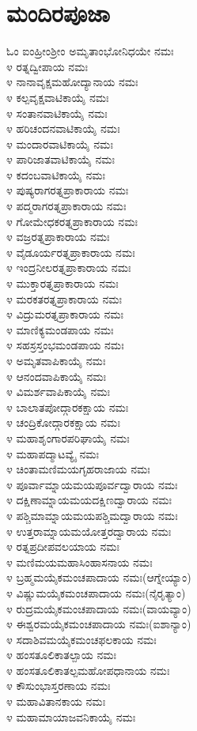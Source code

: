 \section{ಮಂದಿರಪೂಜಾ}
ಓಂ ಐಂಹ್ರೀಂಶ್ರೀಂ ಅಮೃತಾಂಭೋನಿಧಯೇ ನಮಃ\\
೪ ರತ್ನದ್ವೀಪಾಯ ನಮಃ\\
೪ ನಾನಾವೃಕ್ಷಮಹೋದ್ಯಾನಾಯ ನಮಃ\\
೪ ಕಲ್ಪವೃಕ್ಷವಾಟಿಕಾಯೈ ನಮಃ\\
೪ ಸಂತಾನವಾಟಿಕಾಯೈ ನಮಃ\\
೪ ಹರಿಚಂದನವಾಟಿಕಾಯೈ ನಮಃ\\
೪ ಮಂದಾರವಾಟಿಕಾಯೈ ನಮಃ\\
೪ ಪಾರಿಜಾತವಾಟಿಕಾಯೈ ನಮಃ\\
೪ ಕದಂಬವಾಟಿಕಾಯೈ ನಮಃ\\
೪ ಪುಷ್ಯರಾಗರತ್ನಪ್ರಾಕಾರಾಯ ನಮಃ\\
೪ ಪದ್ಮರಾಗರತ್ನಪ್ರಾಕಾರಾಯ ನಮಃ\\
೪ ಗೋಮೇಧಕರತ್ನಪ್ರಾಕಾರಾಯ ನಮಃ\\
೪ ವಜ್ರರತ್ನಪ್ರಾಕಾರಾಯ ನಮಃ\\
೪ ವೈಡೂರ್ಯರತ್ನಪ್ರಾಕಾರಾಯ ನಮಃ\\
೪ ಇಂದ್ರನೀಲರತ್ನಪ್ರಾಕಾರಾಯ ನಮಃ\\
೪ ಮುಕ್ತಾರತ್ನಪ್ರಾಕಾರಾಯ ನಮಃ\\
೪ ಮರಕತರತ್ನಪ್ರಾಕಾರಾಯ ನಮಃ\\
೪ ವಿದ್ರುಮರತ್ನಪ್ರಾಕಾರಾಯ ನಮಃ\\
೪ ಮಾಣಿಕ್ಯಮಂಡಪಾಯ ನಮಃ\\
೪ ಸಹಸ್ರಸ್ತಂಭಮಂಡಪಾಯ ನಮಃ\\
೪ ಅಮೃತವಾಪಿಕಾಯೈ ನಮಃ\\
೪ ಆನಂದವಾಪಿಕಾಯೈ ನಮಃ\\
೪ ವಿಮರ್ಶವಾಪಿಕಾಯೈ ನಮಃ\\
೪ ಬಾಲಾತಪೋದ್ಗಾರಕಕ್ಷಾಯ ನಮಃ\\
೪ ಚಂದ್ರಿಕೋದ್ಗಾರಕಕ್ಷಾಯ ನಮಃ\\
೪ ಮಹಾಶೃಂಗಾರಪರಿಘಾಯೈ ನಮಃ\\
೪ ಮಹಾಪದ್ಮಾಟವ್ಯೈ ನಮಃ\\
೪ ಚಿಂತಾಮಣಿಮಯಗೃಹರಾಜಾಯ ನಮಃ\\
೪ ಪೂರ್ವಾಮ್ನಾಯಮಯಪೂರ್ವದ್ವಾರಾಯ ನಮಃ\\
೪ ದಕ್ಷಿಣಾಮ್ನಾಯಮಯದಕ್ಷಿಣದ್ವಾರಾಯ ನಮಃ\\
೪ ಪಶ್ಚಿಮಾಮ್ನಾಯಮಯಪಶ್ಚಿಮದ್ವಾರಾಯ ನಮಃ\\
೪ ಉತ್ತರಾಮ್ನಾಯಮಯೋತ್ತರದ್ವಾರಾಯ ನಮಃ\\
೪ ರತ್ನಪ್ರದೀಪವಲಯಾಯ ನಮಃ\\
೪ ಮಣಿಮಯಮಹಾಸಿಂಹಾಸನಾಯ ನಮಃ\\
೪ ಬ್ರಹ್ಮಮಯೈಕಮಂಚಪಾದಾಯ ನಮಃ(ಆಗ್ನೇಯ್ಯಾಂ)\\
೪ ವಿಷ್ಣುಮಯೈಕಮಂಚಪಾದಾಯ ನಮಃ(ನೈರೃತ್ಯಾಂ)\\
೪ ರುದ್ರಮಯೈಕಮಂಚಪಾದಾಯ ನಮಃ(ವಾಯವ್ಯಾಂ)\\
೪ ಈಶ್ವರಮಯೈಕಮಂಚಪಾದಾಯ ನಮಃ(ಐಶಾನ್ಯಾಂ)\\
೪ ಸದಾಶಿವಮಯೈಕಮಂಚಫಲಕಾಯ ನಮಃ\\
೪ ಹಂಸತೂಲಿಕಾತಲ್ಪಾಯ ನಮಃ\\
೪ ಹಂಸತೂಲಿಕಾತಲ್ಪಮಹೋಪಧಾನಾಯ ನಮಃ\\
೪ ಕೌಸುಂಭಾಸ್ತರಣಾಯ ನಮಃ\\
೪ ಮಹಾವಿತಾನಕಾಯ ನಮಃ\\
೪ ಮಹಾಮಾಯಾಜವನಿಕಾಯೈ ನಮಃ

